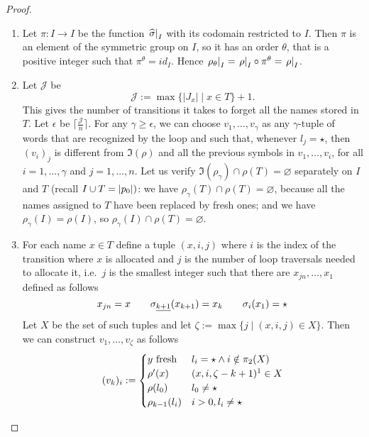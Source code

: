 \begin{proof}\hfill
\begin{enumerate}


\item Let $\pi \colon I \to I$ be the function $\left.\widehat{\sigma}\right|_{I}$ with its codomain restricted to $I$. Then $\pi$ is an element of the symmetric group on $I$, so it has an order $\theta$, that is a positive integer such that $\pi^\theta = id_I$. Hence $\left. \rho_\theta \right|_{ I } =\left. \rho \right|_{I} \circ \pi^\theta = \left. \rho \right|_{I}$.


\item
Let $\mathcal{J}$ be
\[
	\mathcal{J} := \max \{ |J_x|\mid x \in T \} + 1 .
\]
This gives the number of transitions it takes to forget all the names stored in $T$. Let $\epsilon$ be $\lceil \frac{\mathcal{J}}{n} \rceil$. For any $\gamma \geq \epsilon$, we can choose $v_1,\dots,v_\gamma$ as any $\gamma$-tuple of words that are recognized by the loop and such that, whenever $l_j = \star$, then $(v_i)_j$ is different from $\Im(\rho)$ and all the previous symbols in $v_1,\dots,v_i$, for all $i=1,\dots,\gamma$ and $j=1,\dots,n$. Let us verify $\Im(\rho_\gamma) \cap \rho(T) = \varnothing$ separately on $I$ and $T$ (recall $I \cup T = |p_0|)$: we have $\rho_\gamma(T) \cap \rho(T) = \varnothing$, because all the names assigned to $T$ have been replaced by fresh ones; and we have $\rho_\gamma(I) = \rho(I)$, so $\rho_\gamma(I) \cap \rho(T) = \varnothing$.

\item For each name $x \in T$ define a tuple $(x,i,j)$ where $i$ is the index of the transition where $x$ is allocated and $j$ is the number of loop traversals needed to allocate it, i.e.\ $j$ is the smallest integer such that there are $x_{jn},\dots,x_1$ defined as follows
\[
	x_{jn} = x \qquad \sigma_{\underline{k+1}}(x_{k+1}) = x_k \qquad \sigma_i(x_1) = \star
\]
Let $X$ be the set of such tuples and let $\zeta := \max \{ j \mid (x,i,j) \in X \}$. Then we can construct $v_1,\dots,v_\zeta$ as follows
\[
	(v_k)_i :=
	\begin{cases}
		\text{$y$ fresh} & l_i = \star \land i \notin \pi_2(X) \\
		\rho'(x) & (x,i,\zeta - k + 1)\footnotemark \in X
		 \\
		\rho(l_0) & l_0 \neq \star \\
		\rho_{k-1}(l_i) & i > 0 , l_i \neq \star
	\end{cases}
\]


\end{enumerate}
\end{proof}
